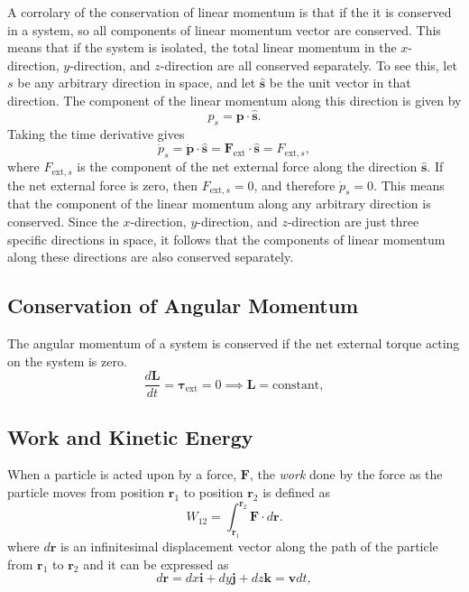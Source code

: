 \documentclass[../main.tex]{subfiles}
\begin{document}
A corrolary of the conservation of linear momentum is that if the it is conserved in a system, so all components of linear momentum vector are conserved. This means that if the system is isolated, the total linear momentum in the $x$-direction, $y$-direction, and $z$-direction are all conserved separately. To see this, let $s$ be any arbitrary direction in space, and let $\hat{\mathbf{s}}$ be the unit vector in that direction. The component of the linear momentum along this direction is given by
\begin{equation}
    p_s = \mathbf{p}\cdot\hat{\mathbf{s}}.
\end{equation}
Taking the time derivative gives
\begin{equation}
    \dot{p}_s = \dot{\mathbf{p}}\cdot\hat{\mathbf{s}} = \mathbf{F}_{\text{ext}}\cdot\hat{\mathbf{s}} = F_{\text{ext},s},
\end{equation}
where $F_{\text{ext},s}$ is the component of the net external force along the direction $\hat{\mathbf{s}}$. If the net external force is zero, then $F_{\text{ext},s} = 0$, and therefore $\dot{p}_s = 0$. This means that the component of the linear momentum along any arbitrary direction is conserved. Since the $x$-direction, $y$-direction, and $z$-direction are just three specific directions in space, it follows that the components of linear momentum along these directions are also conserved separately. 


\subsection{Conservation of Angular Momentum}
The angular momentum of a system is conserved if the net external torque acting on the system is zero.
\begin{equation}
    \frac{d\mathbf{L}}{dt} = \boldsymbol{\tau}_{\text{ext}} = 0 \implies \mathbf{L} = \text{constant},
\end{equation}

\subsection{\label{sec:work-kinetic-energy}Work and Kinetic Energy}

When a particle is acted upon by a force, $\mathbf{F}$, the \emph{work} done by the force as the particle moves from position $\mathbf{r}_1$ to position $\mathbf{r}_2$ is defined as
\begin{equation}
    W_{12} = \int_{\mathbf{r}_1}^{\mathbf{r}_2} \mathbf{F}\cdot d\mathbf{r}.
\end{equation}
where $d\mathbf{r}$ is an infinitesimal displacement vector along the path of the particle from $\mathbf{r}_1$ to $\mathbf{r}_2$ and it can be expressed as
\begin{equation}
    d\mathbf{r} = dx\mathbf{i} + dy\mathbf{j} + dz\mathbf{k} = \mathbf{v} dt,
\end{equation}
\end{document}
